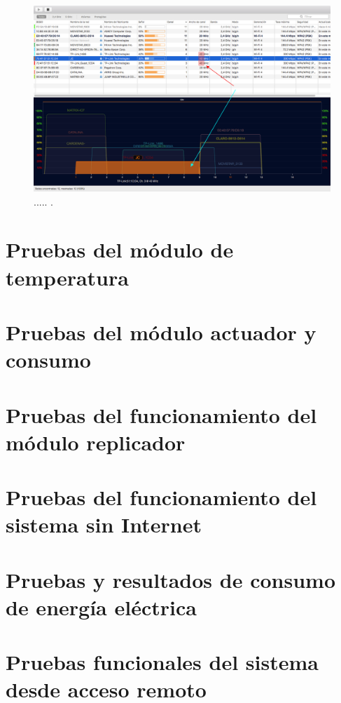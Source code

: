 \begin{landscape} %
\begin{figure}[htpb]
\centering 
\includegraphics[width=1.5\textwidth]{./Figures/wifi/06.png}
\caption{..... .}
\label{fig:test06}
\end{figure}
\end{landscape} %


\section{Pruebas del módulo de temperatura}
\section{Pruebas del módulo actuador y consumo}
\section{Pruebas del funcionamiento del módulo replicador}
\section{Pruebas del funcionamiento del sistema sin Internet}
\section{Pruebas y resultados de consumo de energía eléctrica}
\section{Pruebas funcionales del sistema desde acceso remoto}
